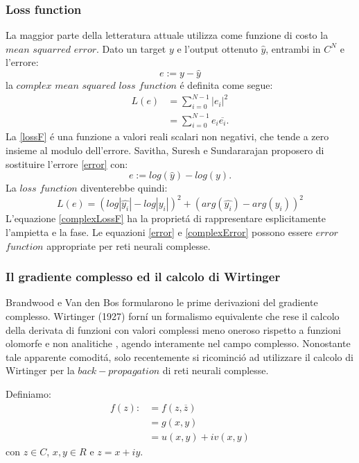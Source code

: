 \documentclass[a4paper,10pt]{article}
\begin{document}
 \subsubsection{Loss function}
 La maggior parte della letteratura attuale utilizza come funzione di costo la $mean$ $squarred$ $error$. Dato un target $y$ e l'output ottenuto $\widehat{y}$, entrambi in $C^N$ e l'errore: 
 \begin{equation}
  e:=y-\widehat{y}\label{error}
 \end{equation}
 la $complex$ $mean$ $squared$ $loss$ $function$ \'e definita come segue:
 \begin{align}
  L(e) &= \sum_{i=0}^{N-1} \left| e_i\right|^2\label{lossF}\\
  &=\sum_{i=0}^{N-1} e_i \overline{e_i}.
 \end{align}
 La \ref{lossF} \'e una funzione a valori reali scalari non negativi, che tende a zero insieme al modulo dell'errore. Savitha, Suresh e Sundararajan proposero di sostituire l'errore \ref{error} con:
 \begin{equation}
  e:=log ( \widehat{y} ) - log ( y ).\label{complexError}
 \end{equation}
 La $loss$ $function$ diventerebbe quindi:
 \begin{equation}
  L(e)=\left( log\left| \widehat{y_i}\right|-log\left| y_i\right|\right)^2 + \left(arg( \widehat{y_i}) - arg  (y_i)\right)^2 \label{complexLossF}
 \end{equation}
 L'equazione \ref{complexLossF} ha la propriet\'a di rappresentare esplicitamente l'ampietta e la fase.
 Le equazioni \ref{error} e \ref{complexError} possono essere $error$ $function$ appropriate per reti neurali complesse.
 
 \subsubsection{Il gradiente complesso ed il calcolo di Wirtinger}
 Brandwood e Van den Bos formularono le prime derivazioni del gradiente complesso. Wirtinger (1927) forn\'i un formalismo equivalente che rese il calcolo della derivata di funzioni con valori complessi meno oneroso rispetto a funzioni olomorfe e non analitiche , agendo interamente nel campo complesso. Nonostante tale apparente comodit\'a, solo recentemente si ricominci\'o ad utilizzare il calcolo di Wirtinger per la $back-propagation$ di reti neurali complesse. 

 Definiamo:
 \begin{align}
  f(z) : &= f\left( z,\overline{z}\right)\\
  &= g\left( x,y\right)\\
  &= u\left( x,y\right) +iv\left( x,y\right)
 \end{align}
 con $z\in C$, $x,y\in R$ e $z=x+iy$. 
\end{document}
